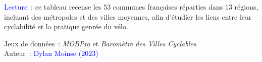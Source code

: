 \begin{table}[h!]
    \label{table-chap4:communes-fub-insee}
        \vspace{5pt}
        \begin{flushleft}\scriptsize
        \textcolor{blue}{Lecture~:} ce tableau recense les 53 communes françaises réparties dans 13 régions, incluant des métropoles et des villes moyennes, afin d'étudier les liens entre leur cyclabilité et la pratique genrée du vélo.
        \end{flushleft}
        \begin{flushright}\scriptsize{
        Jeux de données~: \textsl{MOBPro} \textcolor{blue}{\autocite{insee_documentation_2023}} et \textsl{Baromètre des Villes Cyclables} \textcolor{blue}{\autocite{fub_barometre_2021}}
        \\
        Auteur~: \textcolor{blue}{Dylan Moinse (2023)}
        }\end{flushright}
        \end{table}